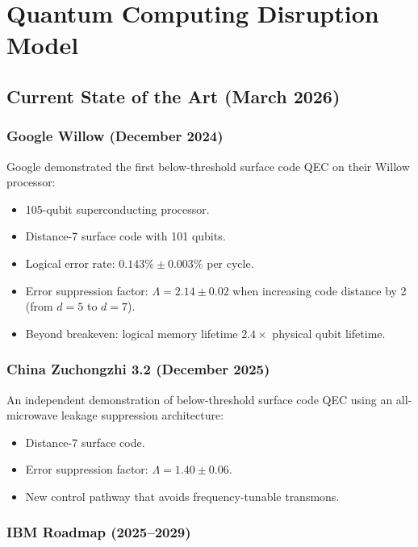 \documentclass[11pt]{article}
\theoremstyle{definition}
\theoremstyle{remark}
\begin{document}
\section{Quantum Computing Disruption Model}
\label{sec:disruption}

\subsection{Current State of the Art (March 2026)}

\subsubsection{Google Willow (December 2024)}

Google demonstrated the first below-threshold surface code QEC on their
Willow processor:
\begin{itemize}[nosep]
\item 105-qubit superconducting processor.
\item Distance-7 surface code with 101 qubits.
\item Logical error rate: $0.143\% \pm 0.003\%$ per cycle.
\item Error suppression factor: $\Lambda = 2.14 \pm 0.02$ when
  increasing code distance by 2 (from $d=5$ to $d=7$).
\item Beyond breakeven: logical memory lifetime $2.4\times$ physical
  qubit lifetime.
\end{itemize}

\subsubsection{China Zuchongzhi 3.2 (December 2025)}

An independent demonstration of below-threshold surface code QEC using
an all-microwave leakage suppression architecture:
\begin{itemize}[nosep]
\item Distance-7 surface code.
\item Error suppression factor: $\Lambda = 1.40 \pm 0.06$.
\item New control pathway that avoids frequency-tunable transmons.
\end{itemize}

\subsubsection{IBM Roadmap (2025--2029)}
\end{document}
